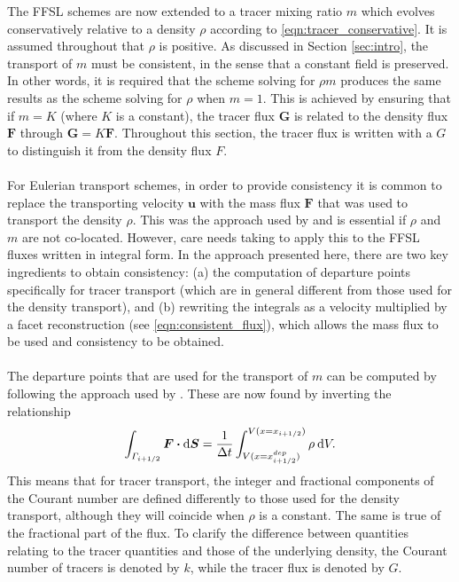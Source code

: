 \documentclass[11pt,a4paper]{article}
\newcommand{\dx}[1]{\hspace{0.75mm}\mathrm{d}{#1}}
\begin{document}
The FFSL schemes are now extended to a tracer mixing ratio $m$ which evolves conservatively relative to a density $\rho$ according to \eqref{eqn:tracer_conservative}.
It is assumed throughout that $\rho$ is positive.
As discussed in Section \ref{sec:intro}, the transport of $m$ must be consistent, in the sense that a constant field is preserved.
In other words, it is required that the scheme solving for $\rho m$ produces the same results as the scheme solving for $\rho$ when $m=1$.
This is achieved by ensuring that if $m=K$ (where $K$ is a constant), the tracer flux $\bm{G}$ is related to the density flux $\bm{F}$ through $\bm{G}=K\bm{F}$.
Throughout this section, the tracer flux is written with a $G$ to distinguish it from the density flux $F$.
\\
\\
For Eulerian transport schemes, in order to provide consistency it is common to replace the transporting velocity $\bm{u}$ with the mass flux $\bm{F}$ that was used to transport the density $\rho$. This was the approach used by \citet{bendall2023solution} and is essential if $\rho$ and $m$ are not co-located.
However, care needs taking to apply this to the FFSL fluxes written in integral form.
In the approach presented here, there are two key ingredients to obtain consistency:
(a) the computation of departure points specifically for tracer transport (which are in general different from those used for the density transport), and (b) rewriting the integrals as a velocity multiplied by a facet reconstruction (see \eqref{eqn:consistent_flux}), which allows the mass flux to be used and consistency to be obtained. \\
\\
The departure points that are used for the transport of $m$ can be computed by following the approach used by \cite{skamarock2006limiters}.
These are now found by inverting the relationship
\begin{equation}
\int_{\varGamma_{i+1/2}} \bm{F} \bm{\cdot} \mathrm{d}\bm{S} = \frac{1}{\Delta t} \int_{V(x=x^{dep}_{i+1/2})}^{V(x=x_{i+1/2})} \rho \dx{V}.
\end{equation}
This means that for tracer transport, the integer and fractional components of the Courant number are defined differently to those used for the density transport, although they will coincide when $\rho$ is a constant.
The same is true of the fractional part of the flux.
To clarify the difference between quantities relating to the tracer quantities and those of the underlying density,
the Courant number of tracers is denoted by $k$, while the tracer flux is denoted by $G$.
\end{document}
